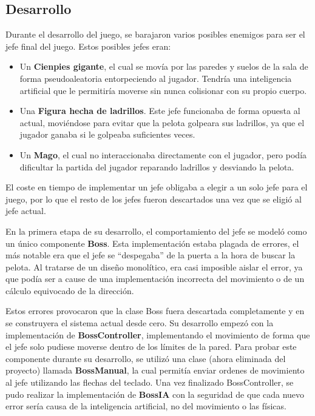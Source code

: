 \subsection{Desarrollo}
Durante el desarrollo del juego, se barajaron varios posibles enemigos para ser el jefe final del juego. Estos posibles jefes eran:
\begin{itemize}
\item Un \textbf{Cienpies gigante}, el cual se movía por las paredes y suelos de la sala de forma pseudoaleatoria entorpeciendo al jugador. Tendría una inteligencia artificial que le permitiría moverse sin nunca colisionar con su propio cuerpo.
\item Una \textbf{Figura hecha de ladrillos}. Este jefe funcionaba de forma opuesta al actual, moviéndose para evitar que la pelota golpeara sus ladrillos, ya que el jugador ganaba si le golpeaba suficientes veces.
\item Un \textbf{Mago}, el cual no interaccionaba directamente con el jugador, pero podía dificultar la partida del jugador reparando ladrillos y desviando la pelota.
\end{itemize}
El coste en tiempo de implementar un jefe obligaba a elegir a un solo jefe para el juego, por lo que el resto de los jefes fueron descartados una vez que se eligió al jefe actual.

En la primera etapa de su desarrollo, el comportamiento del jefe se modeló como un único componente \textbf{Boss}. Esta implementación estaba plagada de errores, el más notable era que el jefe se ``despegaba'' de la puerta a la hora de buscar la pelota. Al tratarse de un diseño monolítico, era casi imposible aislar el error, ya que podía ser a cause de una implementación incorrecta del movimiento o de un cálculo equivocado de la dirección.

Estos errores provocaron que la clase Boss fuera descartada completamente y en se construyera el sistema actual desde cero. Su desarrollo empezó con la implementación de \textbf{BossController}, implementando el movimiento de forma que el jefe solo pudiese moverse dentro de los límites de la pared. Para probar este componente durante su desarrollo, se utilizó una clase (ahora eliminada del proyecto) llamada \textbf{BossManual}, la cual permitía enviar ordenes de movimiento al jefe utilizando las flechas del teclado. Una vez finalizado BossController, se pudo realizar la implementación de \textbf{BossIA} con la seguridad de que cada nuevo error sería causa de la inteligencia artificial, no del movimiento o las físicas.
